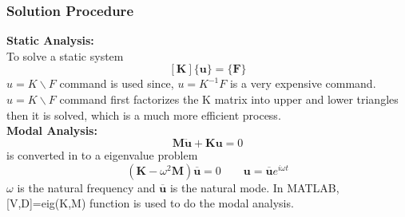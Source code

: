 \documentclass[9pt]{beamer}
\begin{document}
\begin{frame}
\frametitle{Solution Procedure}
\textbf{Static Analysis:}\\

To solve a static system  
\begin{equation*}
 \left[ \mathbf{K}  \right] 
\{\mathbf{u} \}
=
\{ \mathbf{F} \} 
\end{equation*}
 $ u=K \backslash F $ command is used since, $u=K^{-1}F$ is a very expensive command. $u=K \backslash F$ command first factorizes the K matrix into upper and lower triangles then it is solved, which is a much more efficient process.
\\ 
\textbf{Modal Analysis:}\\ 


\begin{equation*}
\mathbf{M}\mathbf{\ddot{{ u}}}+\mathbf{K}\mathbf{{ u}}=0
\end{equation*}
is converted in to a eigenvalue  problem
\begin{equation*}
\left( \mathbf{K} - \omega^2 \mathbf{M}  \right) \overline{\mathbf{u} } = 0 \qquad { \mathbf{u}}=\overline{ \mathbf{u}}e^{i\omega t}
\end{equation*}
$\omega$ is the natural frequency and $\overline{\mathbf{u}}$ is the natural mode. In MATLAB, [V,D]=eig(K,M) function is used to do the modal analysis.
\end{frame}
\end{document}
